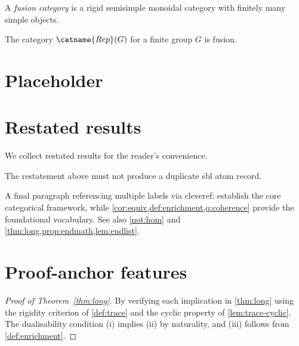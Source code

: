 \documentclass{article}
\numberwithin{equation}{section}
\begin{document}
\begin{definition}\label{def:nested}
A \emph{fusion category} is a rigid semisimple monoidal category
with finitely many simple objects.
\begin{example}\label{ex:nested}
The category $\catname{Rep}(G)$ for a finite group $G$ is fusion.
\end{example}
\end{definition}

\section{Placeholder}
\label{sec:empty}

\section{Restated results}
\label{sec:restate}

We collect restated results for the reader's convenience.

\CoherenceThm*

The restatement above must not produce a duplicate sbl atom record.

A final paragraph referencing multiple labels via cleveref:
 establish the core
categorical framework, while
\cref{cor:equiv,def:enrichment,q:coherence} provide the
foundational vocabulary.  See also \autoref{not:hom} and
\cref{thm:long,prop:endmath,lem:endlist}.


\section{Proof-anchor features}
\label{sec:w04proof}

\begin{proof}[Proof of Theorem~\ref{thm:long}]%
By verifying each implication in \cref{thm:long} using the rigidity
criterion of \cref{def:trace} and the cyclic property of \cref{lem:trace-cyclic}.
The dualisability condition (i) implies (ii) by naturality, and (iii)
follows from \cref{def:enrichment}.
\end{proof}
\end{document}
